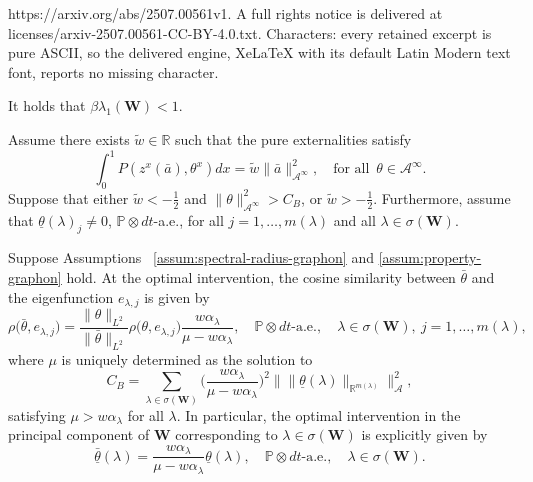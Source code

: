 \documentclass[10pt,a4paper]{amsart}
\def\P{\mathbb{P}}
\def\al{\alpha}
\newcommand{\R}{{\mathbb R}}
\newcommand{\be}{\begin{equation}}
\newcommand{\ee}{\end{equation}}
\begin{document}
https://arxiv.org/abs/2507.00561v1. A full rights notice is delivered at licenses/arxiv-2507.00561-CC-BY-4.0.txt. Characters: every retained excerpt is pure ASCII, so the delivered engine, XeLaTeX with its default Latin Modern text font, reports no missing character.
\begin{assumption}\label{assum:spectral-radius-graphon}
It holds that $\beta\lambda_1(\boldsymbol{W}) <1$.
\end{assumption}

\begin{assumption}\label{assum:property-graphon}
Assume there exists $\tilde{w}\in\R$ such that the pure externalities satisfy 
$$
\int_0^1 P\left(z^x(\bar a),\theta^x\right)dx=\tilde{w} \|\bar a\|^2_{\mathcal{A}^\infty},\quad\textrm{for all }\,\theta\in\mathcal{A}^\infty.
$$
Suppose that either $\tilde{w}<-\frac{1}{2}$ and $\|\theta\|_{\mathcal{A}^\infty}^2> C_B$, or $\tilde{w}>-\frac{1}{2}$. Furthermore, assume that $\underline{\theta}(\lambda)_j\neq 0$, $\P \otimes dt$-a.e., for all $j=1,\ldots,m(\lambda)$ and all $\lambda\in\sigma(\boldsymbol{W})$.
\end{assumption}

\begin{theorem}\label{thm:LQ-graphon}
    Suppose Assumptions~ \ref{assum:spectral-radius-graphon} and \ref{assum:property-graphon} hold.
    At the optimal intervention, the cosine similarity between $\bar\theta$ and the eigenfunction $e_{\lambda,j}$ is given by
    \be\label{eq:main-graphon-cosine-similarity-LQ}
    \rho\big(\bar\theta,e_{\lambda,j}\big)
    =\frac{\|\theta\|_{L^2}}{\|\bar\theta\|_{L^2}}\rho\big(\theta,e_{\lambda,j}\big)\frac{w\al_\lambda}{\mu-w\al_\lambda},\quad \P \otimes dt \textrm{-a.e.},\quad \lambda\in\sigma(\boldsymbol{W}),\ j=1,\ldots, m(\lambda),
    \ee
    where $\mu$ is uniquely determined as the solution to
    \be\label{eqshadow-price-graphon-LQ}
    C_B=\sum_{\lambda\in\sigma(\boldsymbol{W})}\big(\frac{w\al_\lambda}{\mu-w\al_\lambda}\big)^2\big\|\|{\underline{\theta}}(\lambda)\|_{\R^{m(\lambda)}}\big\|_{\mathcal{A}}^2,
    \ee
    satisfying $\mu>w\al_\lambda$ for all $\lambda$. In particular, the optimal intervention in the principal component of $\boldsymbol{W}$ corresponding to $\lambda\in\sigma(\boldsymbol{W})$ is explicitly given by 
    \be\label{eq:optimal-zeta-graphon-LQ}
    \bar{\underline{\theta}}(\lambda)=\frac{w\al_\lambda}{\mu-w\al_\lambda}{\underline{\theta}}(\lambda),\quad \P \otimes dt \textrm{-a.e.},\quad \lambda\in\sigma(\boldsymbol{W}).
    \ee
\end{theorem}
\end{document}
